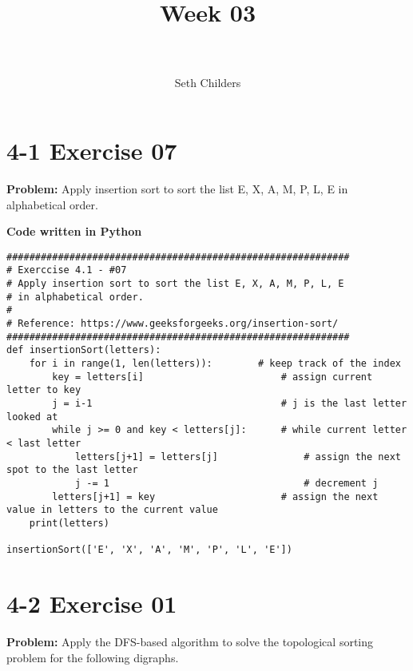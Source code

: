 \documentclass[paper=a4, fontsize=11pt]{scrartcl} %
\title{	
\normalfont \normalsize 
\horrule{0.5pt} \\[0.4cm] %
\huge Week 03 \\ %
\horrule{2pt} \\[0.5cm] %
}
\author{Seth Childers} %
\date{} %
\numberwithin{equation}{section}
\numberwithin{figure}{section}
\numberwithin{table}{section}
\begin{document}
\maketitle %


\section{4-1 Exercise 07}

\textbf{Problem:} Apply insertion sort to sort the list E, X, A, M, P, L, E in alphabetical order.

\bigskip
\textbf{Code written in Python}
\begin{lstlisting}
############################################################
# Exerccise 4.1 - #07
# Apply insertion sort to sort the list E, X, A, M, P, L, E
# in alphabetical order.
#
# Reference: https://www.geeksforgeeks.org/insertion-sort/
############################################################
def insertionSort(letters):
    for i in range(1, len(letters)):        # keep track of the index
        key = letters[i]                        # assign current letter to key
        j = i-1                                 # j is the last letter looked at
        while j >= 0 and key < letters[j]:      # while current letter < last letter
            letters[j+1] = letters[j]               # assign the next spot to the last letter
            j -= 1                                  # decrement j    
        letters[j+1] = key                      # assign the next value in letters to the current value
    print(letters)

insertionSort(['E', 'X', 'A', 'M', 'P', 'L', 'E'])
\end{lstlisting}
\pagebreak


\section{4-2 Exercise 01}

\textbf{Problem:} Apply the DFS-based algorithm to solve the topological sorting problem for the following digraphs.
\end{document}
